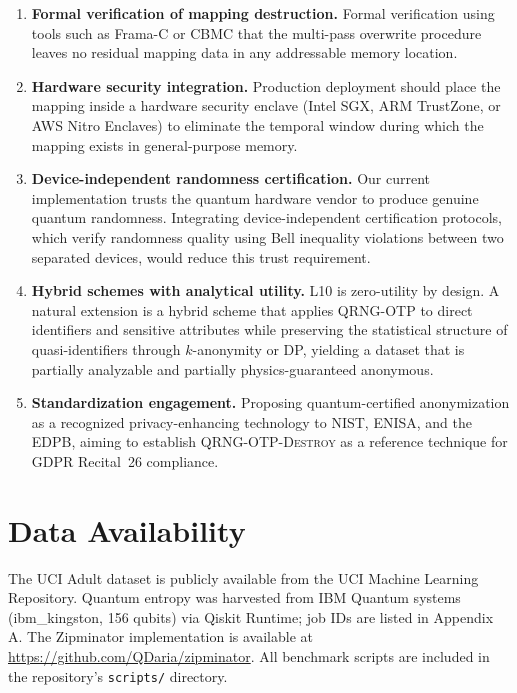 \documentclass[journal]{IEEEtran}
\begin{document}
\begin{enumerate}
\item \textbf{Formal verification of mapping destruction.} Formal verification using tools such as Frama-C or CBMC that the multi-pass overwrite procedure leaves no residual mapping data in any addressable memory location.

\item \textbf{Hardware security integration.} Production deployment should place the mapping inside a hardware security enclave (Intel SGX, ARM TrustZone, or AWS Nitro Enclaves) to eliminate the temporal window during which the mapping exists in general-purpose memory.

\item \textbf{Device-independent randomness certification.} Our current implementation trusts the quantum hardware vendor to produce genuine quantum randomness. Integrating device-independent certification protocols, which verify randomness quality using Bell inequality violations between two separated devices, would reduce this trust requirement.

\item \textbf{Hybrid schemes with analytical utility.} L10 is zero-utility by design. A natural extension is a hybrid scheme that applies QRNG-OTP to direct identifiers and sensitive attributes while preserving the statistical structure of quasi-identifiers through $k$-anonymity or DP, yielding a dataset that is partially analyzable and partially physics-guaranteed anonymous.

\item \textbf{Standardization engagement.} Proposing quantum-certified anonymization as a recognized privacy-enhancing technology to NIST, ENISA, and the EDPB, aiming to establish \textsc{QRNG-OTP-Destroy} as a reference technique for GDPR Recital~26 compliance.
\end{enumerate}

\section*{Data Availability}
The UCI Adult dataset is publicly available from the UCI Machine Learning Repository.
Quantum entropy was harvested from IBM Quantum systems (ibm\_kingston, 156 qubits)
via Qiskit Runtime; job IDs are listed in Appendix A. The Zipminator implementation
is available at \url{https://github.com/QDaria/zipminator}. All benchmark scripts are included
in the repository's \texttt{scripts/} directory.
\end{document}
